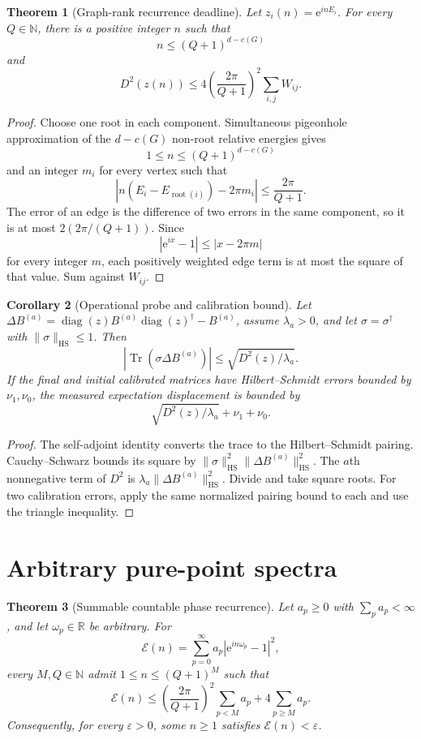 \documentclass[10pt]{article}
\newtheorem{theorem}{Theorem}[section]
\newtheorem{corollary}[theorem]{Corollary}
\theoremstyle{definition}
\newcommand{\R}{\mathbb R}
\newcommand{\N}{\mathbb N}
\newcommand{\HS}{\mathrm{HS}}
\newcommand{\ee}{\mathrm e}
\begin{document}
\begin{theorem}[Graph-rank recurrence deadline]
\label{thm:deadline}
Let \(z_i(n)=\ee^{inE_i}\).  For every \(Q\in\N\), there is a positive
integer \(n\) such that
\[
 n\leq(Q+1)^{d-c(G)}
\]
and
\[
 D^2(z(n))\leq
 4\left(\frac{2\pi}{Q+1}\right)^2\sum_{i,j}W_{ij}.
\]
\end{theorem}

\begin{proof}
Choose one root in each component.  Simultaneous pigeonhole approximation
of the \(d-c(G)\) non-root relative energies gives
\[
 1\leq n\leq(Q+1)^{d-c(G)}
\]
and an integer \(m_i\) for every vertex such that
\[
 |n(E_i-E_{\operatorname{root}(i)})-2\pi m_i|
 \leq\frac{2\pi}{Q+1}.
\]
The error of an edge is the difference of two errors in the same component,
so it is at most \(2(2\pi/(Q+1))\).  Since
\[
 |\ee^{ix}-1|\leq|x-2\pi m|
\]
for every integer \(m\), each positively weighted edge term is at most the
square of that value.  Sum against \(W_{ij}\).
\end{proof}

\begin{corollary}[Operational probe and calibration bound]
\label{cor:operational}
Let
\(\Delta B^{(a)}=\operatorname{diag}(z)B^{(a)}
\operatorname{diag}(z)^\dagger-B^{(a)}\), assume \(\lambda_a>0\), and let
\(\sigma=\sigma^\dagger\) with \(\|\sigma\|_{\HS}\leq1\).  Then
\[
 |\operatorname{Tr}(\sigma\Delta B^{(a)})|
 \leq\sqrt{D^2(z)/\lambda_a}.
\]
If the final and initial calibrated matrices have Hilbert--Schmidt errors
bounded by \(\nu_1,\nu_0\), the measured expectation displacement is bounded
by
\[
 \sqrt{D^2(z)/\lambda_a}+\nu_1+\nu_0.
\]
\end{corollary}

\begin{proof}
The self-adjoint identity converts the trace to the Hilbert--Schmidt pairing.
Cauchy--Schwarz bounds its square by
\(\|\sigma\|_{\HS}^2\|\Delta B^{(a)}\|_{\HS}^2\).  The \(a\)th nonnegative
term of \(D^2\) is
\(\lambda_a\|\Delta B^{(a)}\|_{\HS}^2\).  Divide and take square roots.
For two calibration errors, apply the same normalized pairing bound to each
and use the triangle inequality.
\end{proof}

\section{Arbitrary pure-point spectra}

\begin{theorem}[Summable countable phase recurrence]
\label{thm:countable}
Let \(a_p\geq0\) with \(\sum_pa_p<\infty\), and let
\(\omega_p\in\R\) be arbitrary.  For
\[
 \mathcal E(n)=\sum_{p=0}^{\infty}a_p
   |\ee^{in\omega_p}-1|^2,
\]
every \(M,Q\in\N\) admit \(1\leq n\leq(Q+1)^M\) such that
\[
 \mathcal E(n)\leq
 \left(\frac{2\pi}{Q+1}\right)^2\sum_{p<M}a_p
 +4\sum_{p\geq M}a_p.
\]
Consequently, for every \(\varepsilon>0\), some \(n\geq1\) satisfies
\(\mathcal E(n)<\varepsilon\).
\end{theorem}
\end{document}
